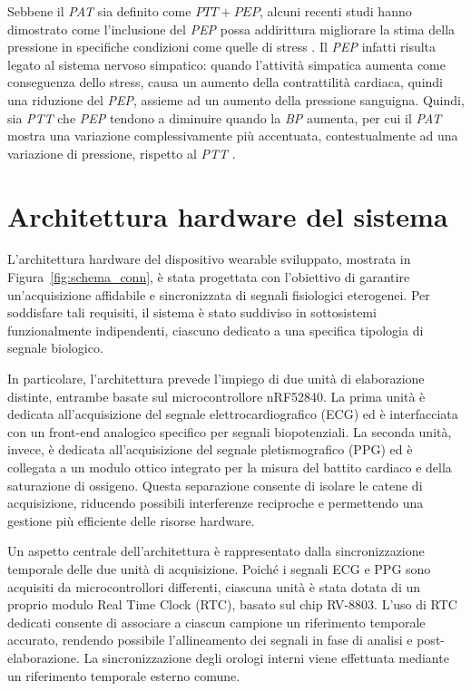 \documentclass[11pt,a4paper]{article}
\begin{document}
Sebbene il \textit{PAT} sia definito come $PTT+PEP$, alcuni recenti studi hanno dimostrato come l'inclusione del \textit{PEP} possa addirittura migliorare la stima della pressione in specifiche condizioni come quelle di stress \cite{Xie_Effects}. Il \textit{PEP} infatti risulta legato al sistema nervoso simpatico: quando l'attività simpatica aumenta come conseguenza dello stress, causa un aumento della contrattilità cardiaca, quindi una riduzione del \textit{PEP}, assieme ad un aumento della pressione sanguigna. Quindi, sia \textit{PTT} che \textit{PEP} tendono a diminuire quando la \textit{BP} aumenta, per cui il \textit{PAT} mostra una variazione complessivamente più accentuata, contestualmente ad una variazione di pressione, rispetto al \textit{PTT} \cite{Xie_Effects}.
 

\section{Architettura hardware del sistema}
L’architettura hardware del dispositivo wearable sviluppato, mostrata in Figura~\ref{fig:schema_conn}, è stata progettata con l’obiettivo di garantire un’acquisizione affidabile e sincronizzata di segnali fisiologici eterogenei.
Per soddisfare tali requisiti, il sistema è stato suddiviso in sottosistemi funzionalmente indipendenti, ciascuno dedicato a una specifica tipologia di segnale biologico.

In particolare, l’architettura prevede l’impiego di due unità di elaborazione distinte, entrambe basate sul microcontrollore nRF52840. La prima unità è dedicata all’acquisizione del segnale elettrocardiografico (ECG) ed è interfacciata con un front-end analogico specifico per segnali biopotenziali. La seconda unità, invece, è dedicata all’acquisizione del segnale pletismografico (PPG) ed è collegata a un modulo ottico integrato per la misura del battito cardiaco e della saturazione di ossigeno.
Questa separazione consente di isolare le catene di acquisizione, riducendo possibili interferenze reciproche e permettendo una gestione più efficiente delle risorse hardware.

Un aspetto centrale dell’architettura è rappresentato dalla sincronizzazione temporale delle due unità di acquisizione. Poiché i segnali ECG e PPG sono acquisiti da microcontrollori differenti, ciascuna unità è stata dotata di un proprio modulo Real Time Clock (RTC), basato sul chip RV-8803. L’uso di RTC dedicati consente di associare a ciascun campione un riferimento temporale accurato, rendendo possibile l’allineamento dei segnali in fase di analisi e post-elaborazione. La sincronizzazione degli orologi interni viene effettuata mediante un riferimento temporale esterno comune.
\end{document}
